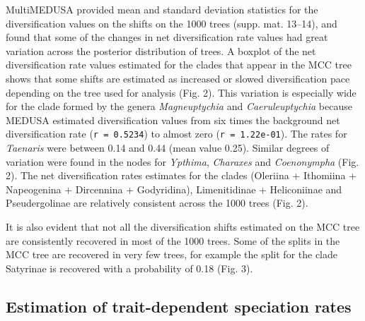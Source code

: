 \documentclass[10pt]{article}
\begin{document}
MultiMEDUSA provided mean and standard deviation statistics for the
diversification values on the shifts on the 1000 trees (supp. mat.
13--14), and found that some of the changes in net diversification rate
values had great variation across the posterior distribution of trees. A
boxplot of the net diversification rate values estimated for the clades
that appear in the MCC tree shows that some shifts are estimated as
increased or slowed diversification pace depending on the tree used for
analysis (Fig. 2). This variation is especially wide for the clade
formed by the genera \emph{Magneuptychia} and \emph{Caeruleuptychia}
because MEDUSA estimated diversification values from six times the
background net diversification rate (\texttt{r = 0.5234}) to almost zero
(\texttt{r = 1.22e-01}). The rates for \emph{Taenaris} were between 0.14
and 0.44 (mean value 0.25). Similar degrees of variation were found in
the nodes for \emph{Ypthima}, \emph{Charaxes} and \emph{Coenonympha}
(Fig. 2). The net diversification rates estimates for the clades
(Oleriina + Ithomiina + Napeogenina + Dircennina + Godyridina),
Limenitidinae + Heliconiinae and Pseudergolinae are relatively
consistent across the 1000 trees (Fig. 2).

It is also evident that not all the diversification shifts estimated on
the MCC tree are consistently recovered in most of the 1000 trees. Some
of the splits in the MCC tree are recovered in very few trees, for
example the split for the clade Satyrinae is recovered with a
probability of 0.18 (Fig. 3).

\subsection*{Estimation of trait-dependent speciation
rates}
\end{document}
